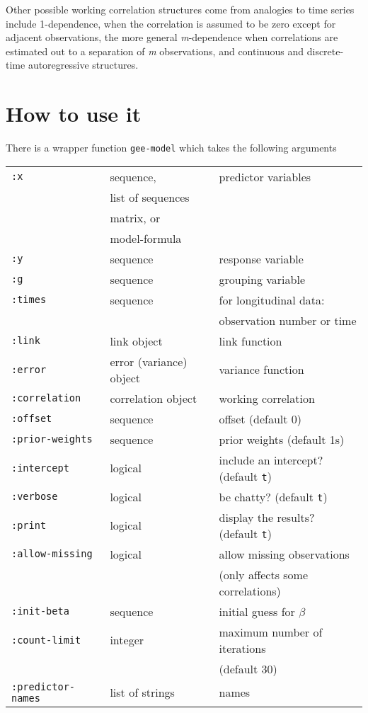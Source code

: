 \documentclass[10pt]{article}
\begin{document}
Other possible working correlation structures come from analogies to time series include 1-dependence, when the correlation is assumed to be zero except for adjacent observations, the more general \emph{m}-dependence when correlations are estimated out to a separation of \emph{m} observations, and continuous and discrete-time autoregressive structures.


\section{How to use it}
There is a wrapper function \texttt{gee-model} which takes the following arguments

\begin{tabular}{lll}
\hline
\texttt{:x} & sequence,  & predictor variables\\
 & list of sequences \\
 & matrix, or &\\
 & model-formula &\\
\texttt{:y} & sequence & response variable\\
\texttt{:g} & sequence & grouping variable\\
\texttt{:times}& sequence & for longitudinal data:\\
                       & & observation number or time\\
\texttt{:link} & link object & link function\\
\texttt{:error} & error (variance) object & variance function\\
\texttt{:correlation} & correlation object & working correlation\\
\texttt{:offset} & sequence & offset (default 0)\\
\texttt{:prior-weights} & sequence & prior weights (default 1s) \\
\texttt{:intercept} & logical & include an intercept? (default {\tt t})\\
\texttt{:verbose} &logical & be chatty?  (default {\tt t})\\
\texttt{:print} & logical & display the results?  (default {\tt t})\\
\texttt{:allow-missing} & logical & allow missing observations\\
                                && (only affects some correlations)\\
\texttt{:init-beta} & sequence & initial guess for $\beta$\\
\texttt{:count-limit} & integer & maximum number of iterations\\
&& (default  30)\\
\texttt{:predictor-names} & list of strings & names\\
\hline
\end{tabular}
\end{document}
